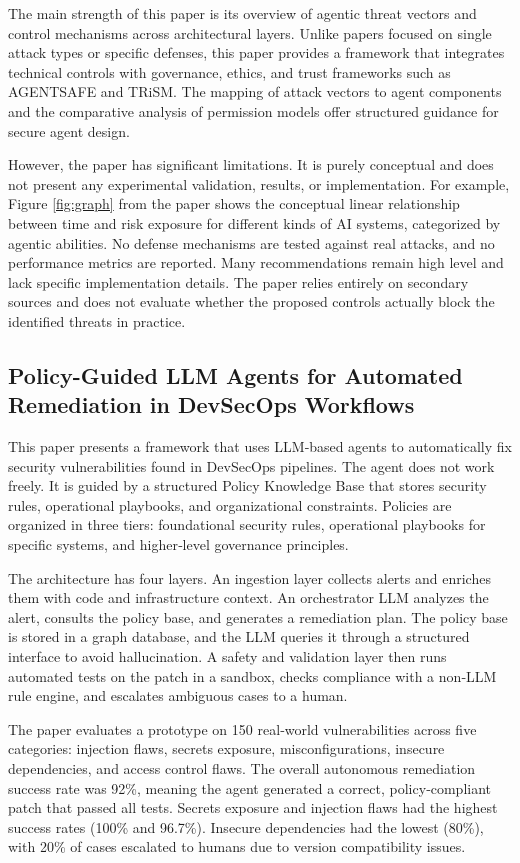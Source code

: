 \documentclass[a4paper]{report}
\begin{document}
The main strength of this paper is its overview of agentic threat vectors and control mechanisms across architectural layers. Unlike papers focused on single attack types or specific defenses, this paper provides a framework that integrates technical controls with governance, ethics, and trust frameworks such as AGENTSAFE and TRiSM. The mapping of attack vectors to agent components and the comparative analysis of permission models offer structured guidance for secure agent design.

However, the paper has significant limitations. It is purely conceptual and does not present any experimental validation, results, or implementation. For example, Figure \ref{fig:graph} from the paper shows the conceptual linear relationship between time and risk exposure for different kinds of AI systems, categorized by agentic abilities. No defense mechanisms are tested against real attacks, and no performance metrics are reported. Many recommendations remain high level and lack specific implementation details. The paper relies entirely on secondary sources and does not evaluate whether the proposed controls actually block the identified threats in practice.

\subsection{Policy-Guided LLM Agents for Automated Remediation in DevSecOps Workflows}
This paper \cite{sharma2025policy} presents a framework that uses LLM‑based agents to automatically fix security vulnerabilities found in DevSecOps pipelines. The agent does not work freely. It is guided by a structured Policy Knowledge Base that stores security rules, operational playbooks, and organizational constraints. Policies are organized in three tiers: foundational security rules, operational playbooks for specific systems, and higher‑level governance principles.

The architecture has four layers. An ingestion layer collects alerts and enriches them with code and infrastructure context. An orchestrator LLM analyzes the alert, consults the policy base, and generates a remediation plan. The policy base is stored in a graph database, and the LLM queries it through a structured interface to avoid hallucination. A safety and validation layer then runs automated tests on the patch in a sandbox, checks compliance with a non‑LLM rule engine, and escalates ambiguous cases to a human.

The paper evaluates a prototype on 150 real‑world vulnerabilities across five categories: injection flaws, secrets exposure, misconfigurations, insecure dependencies, and access control flaws. The overall autonomous remediation success rate was 92\%, meaning the agent generated a correct, policy‑compliant patch that passed all tests. Secrets exposure and injection flaws had the highest success rates (100\% and 96.7\%). Insecure dependencies had the lowest (80\%), with 20\% of cases escalated to humans due to version compatibility issues.
\end{document}
